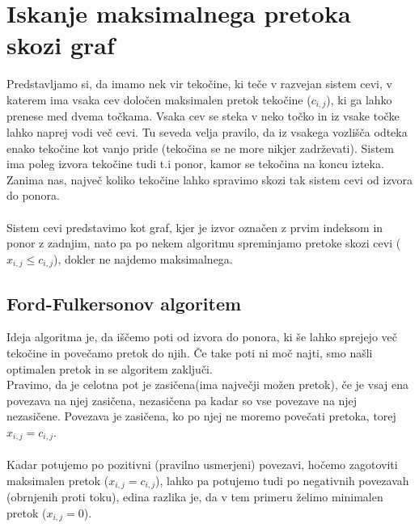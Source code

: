 \documentclass[10pt,a4paper,oneside]{book}
\begin{document}
\section{Iskanje maksimalnega pretoka skozi graf}
Predstavljamo si, da imamo nek vir tekočine, ki teče v razvejan sistem cevi, v katerem ima vsaka cev določen maksimalen pretok tekočine ($c_{i,j}$), ki ga lahko prenese med dvema točkama. Vsaka cev se steka v neko točko in iz vsake točke lahko naprej vodi več cevi. Tu seveda velja pravilo, da iz vsakega vozlišča odteka enako tekočine kot vanjo pride (tekočina se ne more nikjer zadrževati). Sistem ima poleg izvora tekočine tudi t.i ponor, kamor se tekočina na koncu izteka. Zanima nas, največ koliko tekočine lahko spravimo skozi tak sistem cevi od izvora do ponora.\\
\\
Sistem cevi predstavimo kot graf, kjer je izvor označen z prvim indeksom in ponor z zadnjim, nato pa po nekem algoritmu spreminjamo pretoke skozi cevi ($x_{i,j} \le c_{i,j}$), dokler ne najdemo maksimalnega.

\subsection{Ford-Fulkersonov algoritem}
Ideja algoritma je, da iščemo poti od izvora do ponora, ki še lahko sprejejo več tekočine in povečamo pretok do njih. Če take poti ni moč najti, smo našli optimalen pretok in se algoritem zaključi.\\
Pravimo, da je celotna pot je zasičena(ima največji možen pretok), če je vsaj ena povezava na njej zasičena, nezasičena pa kadar so vse povezave na njej nezasičene. Povezava je zasičena, ko po njej ne moremo povečati pretoka, torej $x_{i,j}=c_{i,j}$.\\
\\
Kadar potujemo po pozitivni (pravilno usmerjeni) povezavi, hočemo zagotoviti maksimalen pretok ($x_{i,j} = c_{i,j}$), lahko pa potujemo tudi po negativnih povezavah (obrnjenih proti toku), edina razlika je, da v tem primeru želimo minimalen pretok ($x_{i,j} = 0$).

\end{document}
